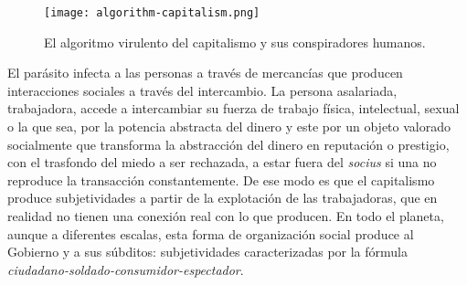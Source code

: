 \begin{figure}[htbp]
	\centering
	\texttt{[image: algorithm-capitalism.png]}
	\caption[El algoritmo virulento del capitalismo.]{El algoritmo virulento del capitalismo y sus conspiradores humanos.}
	\label{fig:algoritmo}
\end{figure}

El parásito infecta a las personas a través de mercancías que producen interacciones sociales a través del intercambio. La persona asalariada, trabajadora, accede a intercambiar su fuerza de trabajo física, intelectual, sexual o la que sea, por la potencia abstracta del dinero y este por un objeto valorado socialmente que transforma la abstracción del dinero en reputación o prestigio, con el trasfondo del miedo a ser rechazada, a estar fuera del \emph{socius} si una no reproduce la transacción constantemente. De ese modo es que el capitalismo produce subjetividades a partir de la explotación de las trabajadoras, que en realidad no tienen una conexión real con lo que producen. En todo el planeta, aunque a diferentes escalas, esta forma de organización social produce al Gobierno y a sus súbditos: subjetividades caracterizadas por la fórmula \emph{ciudadano-soldado-consumidor-espectador}.

